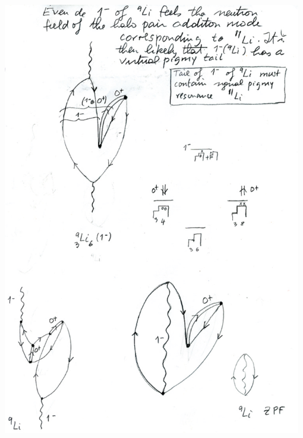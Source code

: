 \documentclass[a4paper,onecolumn,superscriptaddress,12pt,nofootinbib,twoside,raggedfooter,notitlepage]{revtex4-1}
\begin{document}
\begin{center}
	\includegraphics[width=0.98\textwidth]{figs/fig_c2}
\end{center}
\end{document}

